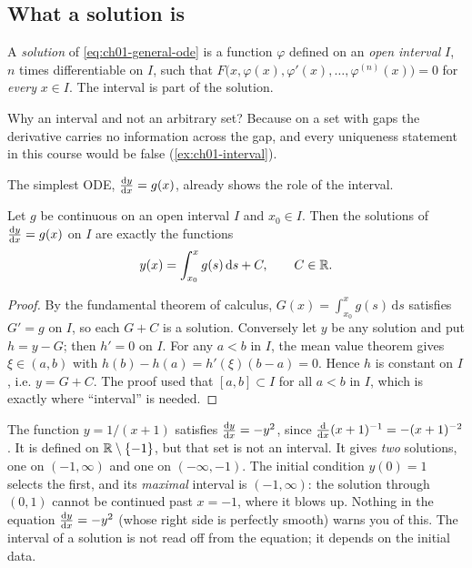 \subsection{What a solution is}

\begin{definition}[Solution]\label{def:ch01-solution}
A \emph{solution} of \eqref{eq:ch01-general-ode} is a function $\varphi$
defined on an \emph{open interval} $I$, $n$ times differentiable on $I$, such
that
$F\bigl(x,\varphi(x),\varphi'(x),\dots,\varphi^{(n)}(x)\bigr) = 0$ for
\emph{every} $x\in I$. The interval is part of the solution.
\end{definition}

\noindent Why an interval and not an arbitrary set? Because on a set with gaps
the derivative carries no information across the gap, and every uniqueness
statement in this course would be false (\cref{ex:ch01-interval}).

The simplest ODE, $\der{y}{x} = g(x)$, already shows the role of the interval.

\begin{theorem}[Solutions of $\der{y}{x} = g(x)$]\label{thm:ch01-antiderivative}
Let $g$ be continuous on an open interval $I$ and $x_0\in I$. Then the
solutions of $\der{y}{x} = g(x)$ on $I$ are exactly the functions
\[
  y(x) = \int_{x_0}^{x} g(s)\,\mathrm{d}s + C,\qquad C\in\mathbb{R} .
\]
\end{theorem}
\begin{proof}
By the fundamental theorem of calculus, $G(x) = \int_{x_0}^x g(s)\,\mathrm{d}s$
satisfies $G' = g$ on $I$, so each $G + C$ is a solution. Conversely let $y$ be
any solution and put $h = y - G$; then $h' = 0$ on $I$. For any $a<b$ in $I$,
the mean value theorem gives $\xi\in(a,b)$ with
$h(b) - h(a) = h'(\xi)(b-a) = 0$. Hence $h$ is constant on $I$, i.e.
$y = G + C$. The proof used that $[a,b]\subset I$ for all $a<b$ in $I$, which
is exactly where ``interval'' is needed.
\end{proof}

\begin{example}\label{ex:ch01-interval}
The function $y = 1/(x+1)$ satisfies $\frac{\mathrm{d}y}{\mathrm{d}x} = -y^2$, since
$\frac{\mathrm{d}}{\mathrm{d}x}(x+1)^{-1} = -(x+1)^{-2}$. It is defined on $\mathbb{R}\setminus\{-1\}$, but
that set is not an interval. It gives \emph{two} solutions, one on
$(-1,\infty)$ and one on $(-\infty,-1)$. The initial condition $y(0) = 1$
selects the first, and its \emph{maximal} interval is $(-1,\infty)$: the
solution through $(0,1)$ cannot be continued past $x=-1$, where it blows up.
Nothing in the equation $\frac{\mathrm{d}y}{\mathrm{d}x}=-y^2$ (whose right side is perfectly
smooth) warns you of this. The interval of a solution is not read off from
the equation; it depends on the initial data.
\end{example}

